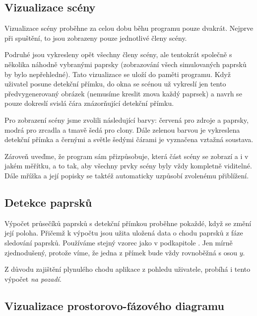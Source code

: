 \subsection{Vizualizace scény}

Vizualizace scény proběhne za celou dobu běhu programu pouze dvakrát. Nejprve při spuštění, to jsou zobrazeny pouze jednotlivé členy scény.


Podruhé jsou vykresleny opět všechny členy scény, ale tentokrát společně s několika náhodně vybranými paprsky (zobrazování všech simulovaných paprsků by bylo nepřehledné). Tato vizualizace se uloží do paměti programu. Když uživatel posune detekční přímku, do okna se scénou už vykreslí jen tento předvygenerovaný obrázek (nemusíme kreslit znova každý paprsek) a navrh se pouze dokreslí svislá čára znázorňující detekční přímku.


Pro zobrazení scény jsme zvolili následující barvy: červená pro zdroje a paprsky, modrá pro zrcadla a tmavě šedá pro clony. Dále zelenou barvou je vykreslena detekční přímka a černými a světle šedými čárami je vyznačena vztažná soustava.

Zároveň uveďme, že program sám přizpůsobuje, která část scény se zobrazí a i v jakém měřítku, a to tak, aby všechny prvky scény byly vždy kompletně viditelné. Dále mřížka a její popisky se taktéž automaticky uzpůsobí zvolenému přiblížení.

\subsection{Detekce paprsků}

Výpočet průsečíků paprsků s detekční přímkou proběhne pokaždé, když se změní její poloha. Přičemž k výpočtu jsou užita uložená data o chodu paprsků z fáze sledování paprsků. Používáme stejný vzorec jako v podkapitole . Jen mírně zjednodušený, protože víme, že jedna z přímek bude vždy rovnoběžná s osou $y$.

Z důvodu zajištění plynulého chodu aplikace z pohledu uživatele, probíhá i tento výpočet \emph{na pozadí}.


\subsection{Vizualizace prostorovo-fázového diagramu}

